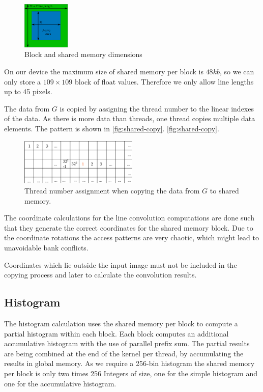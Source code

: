 \begin{figure}[htb]
  \centering
  \includegraphics[width=0.2\textwidth]{images/shared-memory.png}
  \caption{Block and shared memory dimensions}
  \label{fig:shared-memory}
\end{figure}

On our device the maximum size of shared memory per block is $48kb$, so we can
only store a $109\times109$ block of float values. Therefore we only allow line
lengths up to 45 pixels.

The data from $G$ is copied by assigning the thread number to the linear
indexes of the data. As there is more data than threads, one thread copies
multiple data elements. The pattern is shown in \autoref{fig:shared-copy}.
\autoref{fig:shared-copy}.
\begin{figure}[htb]
  \centering
  \includegraphics[width=0.5\textwidth]{images/shared-copy.png}
  \caption{Thread number assignment when copying the data from $G$ to shared memory.}
  \label{fig:shared-copy}
\end{figure}

The coordinate calculations for the line convolution computations are done such
that they generate the correct coordinates for the shared memory block. Due to
the coordinate rotations the access patterns are very chaotic, which might lead
to unavoidable bank conflicts.

Coordinates which lie outside the input image must not be included in the
copying process and later to calculate the convolution results.



\subsection{Histogram}
The histogram calculation uses the shared memory per block to compute a partial
histogram within each block.  Each block computes an additional accumulative
histogram with the use of parallel prefix sum.  The partial results are being
combined at the end of the kernel per thread, by accumulating the results in
global memory.  As we require a 256-bin histogram the shared memory per block
is only two times 256 Integers of size, one for the simple histogram and one
for the accumulative histogram.

